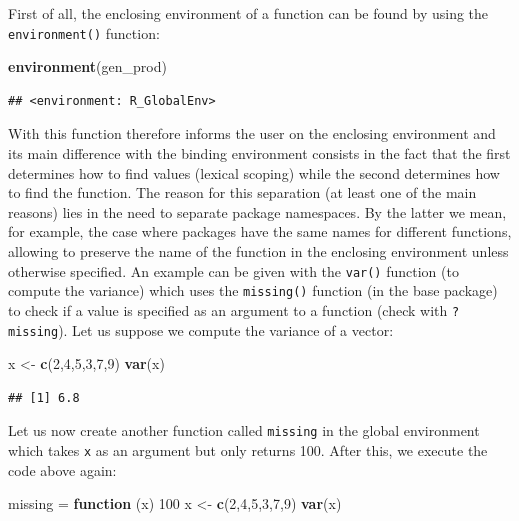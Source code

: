 \documentclass[12pt,]{krantz}
\newenvironment{Shaded}{\begin{snugshade}}{\end{snugshade}}
\newcommand{\KeywordTok}[1]{\textcolor[rgb]{0.27,0.27,0.27}{\textbf{#1}}}
\newcommand{\DecValTok}[1]{\textcolor[rgb]{0.06,0.06,0.06}{#1}}
\newcommand{\StringTok}[1]{\textcolor[rgb]{0.5,0.5,0.5}{#1}}
\newcommand{\ControlFlowTok}[1]{\textcolor[rgb]{0.27,0.27,0.27}{\textbf{#1}}}
\newcommand{\NormalTok}[1]{#1}
\begin{document}
First of all, the enclosing environment of a function can be found by
using the \texttt{environment()} function:

\begin{Shaded}
\begin{Highlighting}[]
\KeywordTok{environment}\NormalTok{(gen_prod)}
\end{Highlighting}
\end{Shaded}

\begin{verbatim}
## <environment: R_GlobalEnv>
\end{verbatim}

With this function therefore informs the user on the enclosing
environment and its main difference with the binding environment
consists in the fact that the first determines how to find values
(lexical scoping) while the second determines how to find the function.
The reason for this separation (at least one of the main reasons) lies
in the need to separate package namespaces. By the latter we mean, for
example, the case where packages have the same names for different
functions, allowing to preserve the name of the function in the
enclosing environment unless otherwise specified. An example can be
given with the \texttt{var()} function (to compute the variance) which
uses the \texttt{missing()} function (in the base package) to check if a
value is specified as an argument to a function (check with
\texttt{?missing}). Let us suppose we compute the variance of a vector:

\begin{Shaded}
\begin{Highlighting}[]
\NormalTok{x <-}\StringTok{ }\KeywordTok{c}\NormalTok{(}\DecValTok{2}\NormalTok{,}\DecValTok{4}\NormalTok{,}\DecValTok{5}\NormalTok{,}\DecValTok{3}\NormalTok{,}\DecValTok{7}\NormalTok{,}\DecValTok{9}\NormalTok{)}
\KeywordTok{var}\NormalTok{(x)}
\end{Highlighting}
\end{Shaded}

\begin{verbatim}
## [1] 6.8
\end{verbatim}

Let us now create another function called \texttt{missing} in the global
environment which takes \texttt{x} as an argument but only returns 100.
After this, we execute the code above again:

\begin{Shaded}
\begin{Highlighting}[]
\NormalTok{missing =}\StringTok{ }\ControlFlowTok{function}\NormalTok{ (x) }\DecValTok{100}
\NormalTok{x <-}\StringTok{ }\KeywordTok{c}\NormalTok{(}\DecValTok{2}\NormalTok{,}\DecValTok{4}\NormalTok{,}\DecValTok{5}\NormalTok{,}\DecValTok{3}\NormalTok{,}\DecValTok{7}\NormalTok{,}\DecValTok{9}\NormalTok{)}
\KeywordTok{var}\NormalTok{(x)}
\end{Highlighting}
\end{Shaded}
\end{document}
